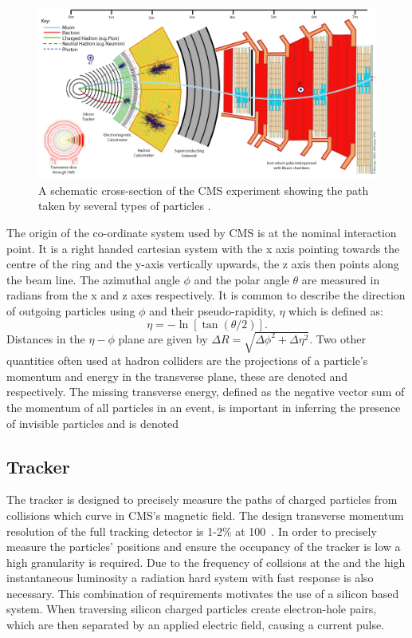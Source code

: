 \begin{figure}
  \includegraphics[width=1.2\largefigwidth]{plots/detector/CMS_Slice.png}
  \caption{A schematic cross-section of the CMS experiment showing the path taken by several types of particles \cite{CMSSlice}.}
  \label{fig:cmsschematic2}
\end{figure}

The origin of the co-ordinate system used by CMS is at the nominal interaction point. It is a right handed cartesian system with the x axis pointing towards the centre of the \LHC ring and the y-axis vertically upwards, the z axis then points along the beam line. The azimuthal angle $\phi$ and the polar angle $\theta$ are measured in radians from the x and z axes respectively. It is common to describe the direction of outgoing particles using $\phi$ and their pseudo-rapidity, $\eta$ which is defined as:
\begin{equation}
  \label{eq:eta}
  \eta=-\ln[\tan(\theta/2)].
\end{equation}
Distances in the $\eta-\phi$ plane are given by $\Delta R=\sqrt{\Delta\phi^2+\Delta\eta^2}$. Two other quantities often used at hadron colliders are the projections of a particle's momentum and energy in the transverse plane, these are denoted \pt and \Et respectively. The missing transverse energy, defined as the negative vector sum of the momentum of all particles in an event, is important in inferring the presence of invisible particles and is denoted \MET

\subsection{Tracker}
\label{sec:tracker}
The tracker is designed to precisely measure the paths of charged particles from \LHC collisions which curve in CMS's magnetic field. The design transverse momentum resolution of the full tracking detector is 1-2\% at 100\GeV~. In order to precisely measure the particles' positions and ensure the occupancy of the tracker is low a high granularity is required. Due to the frequency of collsions at the \LHC and the high instantaneous luminosity a radiation hard system with fast response is also necessary. This combination of requirements motivates the use of a silicon based system. When traversing silicon charged particles create electron-hole pairs, which are then separated by an applied electric field, causing a current pulse.

